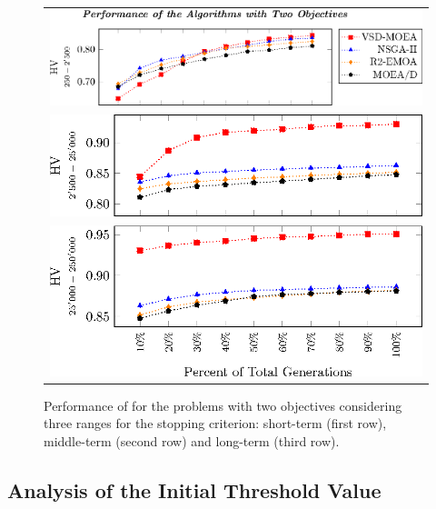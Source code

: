 \begin{figure}[t]
\centering
\begin{tabular}{l}
 \includegraphics[scale=0.6]{Images/Time_tikz-figure0.eps}\\[0cm]%
 \includegraphics[scale=0.6]{Images/Time_tikz-figure1.eps}\\[0cm]%
 \includegraphics[scale=0.6]{Images/Time_tikz-figure2.eps}
\end{tabular}
\caption{Performance of \MOEAS{} for the problems with two objectives considering three ranges for the stopping criterion: short-term (first row), middle-term (second row) and long-term (third row).}\label{fig:Performance_time_2obj}
\end{figure}



\subsection{Analysis of the Initial Threshold Value}

